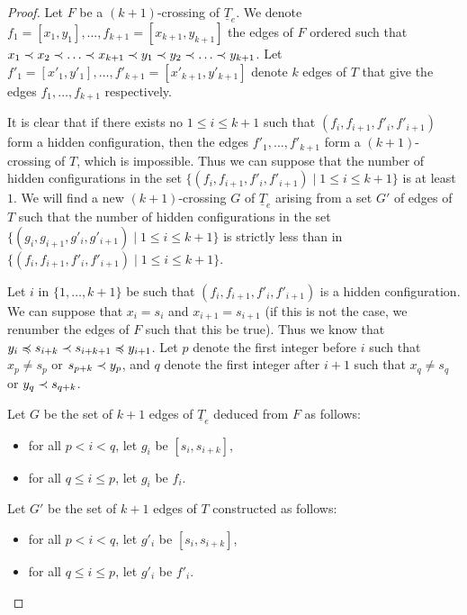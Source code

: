 \documentclass[12pt]{amsart}
\begin{document}
\begin{proof}
Let $F$ be a $(k+1)$-crossing of $\underline{T}_e$. We denote $f_1=[x_1,y_1],\ldots,f_{k+1}=[x_{k+1},y_{k+1}]$ the edges of $F$ ordered such that $x_1\prec x_2\prec\ldots\prec x_{k+1}\prec y_1\prec y_2\prec \ldots\prec y_{k+1}$. Let $f'_1=[x'_1,y'_1],\ldots,f'_{k+1}=[x'_{k+1},y'_{k+1}]$ denote $k$ edges of $T$ that give the edges $f_1,\ldots,f_{k+1}$ respectively.

It is clear that if there exists no $1\le i\le k+1$ such that $(f_i,f_{i+1},f'_i,f'_{i+1})$ form a hidden configuration, then the edges $f'_1,\ldots,f'_{k+1}$ form a $(k+1)$-crossing of $T$, which is impossible. Thus we can suppose that the number of hidden configurations in the set $\{(f_i,f_{i+1},f'_i,f'_{i+1})\;|\; 1\le i\le k+1\}$ is at least $1$. We will find a new $(k+1)$-crossing $G$ of $\underline{T}_e$ arising from a set $G'$ of edges of $T$ such that the number of hidden configurations in the set $\{(g_i,g_{i+1},g'_i,g'_{i+1})\;|\; 1\le i\le k+1\}$ is strictly less than in $\{(f_i,f_{i+1},f'_i,f'_{i+1})\;|\; 1\le i\le k+1\}$.

Let $i$ in $\{1,\ldots,k+1\}$ be such that $(f_i,f_{i+1},f'_i,f'_{i+1})$ is a hidden configuration. We can suppose that $x_i=s_i$ and $x_{i+1}=s_{i+1}$ (if this is not the case, we renumber the edges of $F$ such that this be true). Thus we know that $y_i\preccurlyeq s_{i+k}\prec s_{i+k+1}\preccurlyeq y_{i+1}$. Let $p$ denote the first integer before $i$ such that $x_p \ne s_p$ or $s_{p+k}\prec y_p$, and $q$ denote the first integer after $i+1$ such that $x_q \ne s_q$ or $y_q\prec s_{q+k}$.

Let $G$ be the set of $k+1$ edges of $\underline{T}_e$ deduced from $F$ as follows:
\begin{itemize}
\item for all $p<i<q$, let $g_i$ be $[s_i,s_{i+k}]$,
\item for all $q\le i\le p$, let $g_i$ be $f_i$.
\end{itemize}
Let $G'$ be the set of $k+1$ edges of $T$ constructed as follows:
\begin{itemize}
\item for all $p<i<q$, let $g'_i$ be $[s_i,s_{i+k}]$,
\item for all $q\le i\le p$, let $g'_i$ be $f'_i$.
\end{itemize}
		

\end{proof}
\end{document}
